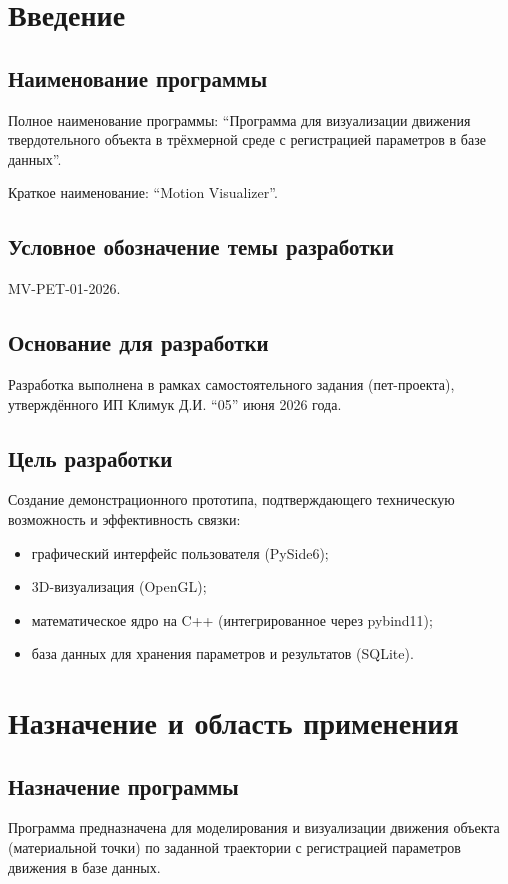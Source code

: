 \documentclass[12pt, a4paper]{article}
\begin{document}
\tableofcontents
\newpage

\section{Введение}

\subsection{Наименование программы}
Полное наименование программы: \enquote{Программа для визуализации движения твердотельного объекта в трёхмерной среде с регистрацией параметров в базе данных}.

Краткое наименование: \enquote{Motion Visualizer}.

\subsection{Условное обозначение темы разработки}
MV-PET-01-2026.

\subsection{Основание для разработки}
Разработка выполнена в рамках самостоятельного задания (пет-проекта), утверждённого ИП Климук Д.И. \enquote{05} июня 2026 года.

\subsection{Цель разработки}
Создание демонстрационного прототипа, подтверждающего техническую возможность и эффективность связки:
\begin{itemize}
    \item графический интерфейс пользователя (PySide6);
    \item 3D-визуализация (OpenGL);
    \item математическое ядро на C++ (интегрированное через pybind11);
    \item база данных для хранения параметров и результатов (SQLite).
\end{itemize}

\section{Назначение и область применения}

\subsection{Назначение программы}
Программа предназначена для моделирования и визуализации движения объекта (материальной точки) по заданной траектории с регистрацией параметров движения в базе данных.
\end{document}
